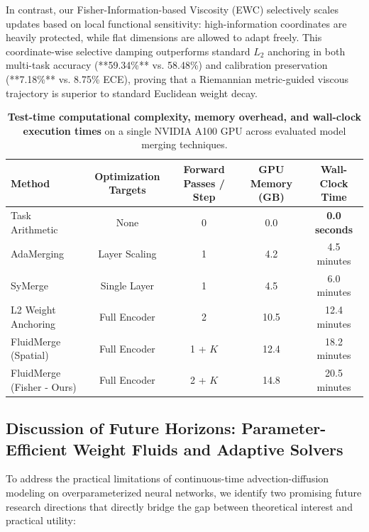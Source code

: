 In contrast, our Fisher-Information-based Viscosity (EWC) selectively scales updates based on local functional sensitivity: high-information coordinates are heavily protected, while flat dimensions are allowed to adapt freely. This coordinate-wise selective damping outperforms standard $L_2$ anchoring in both multi-task accuracy (**59.34\%** vs. 58.48\%) and calibration preservation (**7.18\%** vs. 8.75\% ECE), proving that a Riemannian metric-guided viscous trajectory is superior to standard Euclidean weight decay.

\begin{table}[htbp]
\caption{\textbf{Test-time computational complexity, memory overhead, and wall-clock execution times} on a single NVIDIA A100 GPU across evaluated model merging techniques.}
\label{tab:runtime_complexity}
\vskip 0.15in
\begin{center}
\begin{small}
\begin{sc}
\begin{tabular}{lcccc}
\toprule
Method & Optimization Targets & Forward Passes / Step & GPU Memory (GB) & Wall-Clock Time \\
\midrule
Task Arithmetic & None & 0 & 0.0 & \textbf{0.0 seconds} \\
AdaMerging & Layer Scaling & 1 & 4.2 & 4.5 minutes \\
SyMerge & Single Layer & 1 & 4.5 & 6.0 minutes \\
L2 Weight Anchoring & Full Encoder & 2 & 10.5 & 12.4 minutes \\
FluidMerge (Spatial) & Full Encoder & 1 + $K$ & 12.4 & 18.2 minutes \\
FluidMerge (Fisher - Ours) & Full Encoder & 2 + $K$ & 14.8 & 20.5 minutes \\
\bottomrule
\end{tabular}
\end{sc}
\end{small}
\end{center}
\vskip -0.1in
\end{table}

\subsection{Discussion of Future Horizons: Parameter-Efficient Weight Fluids and Adaptive Solvers}
\label{subsec:horizons}

To address the practical limitations of continuous-time advection-diffusion modeling on overparameterized neural networks, we identify two promising future research directions that directly bridge the gap between theoretical interest and practical utility:

